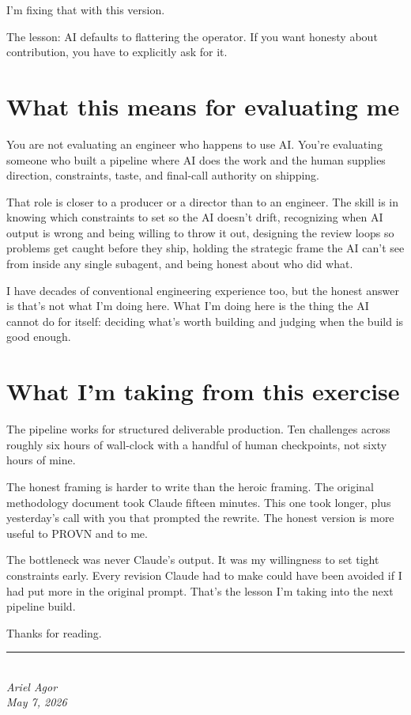 \documentclass[12pt, letterpaper]{article}
\newenvironment{insight}{%
    \begin{tcolorbox}[colback=insightbg, colframe=insightborder,
        title={\small\textbf{Key Insight}},
        fonttitle=\color{insightborder}]
}{%
    \end{tcolorbox}
}
\begin{document}
I'm fixing that with this version.

\begin{insight}
The lesson: AI defaults to flattering the operator. If you want honesty about contribution, you have to explicitly ask for it.
\end{insight}

\section{What this means for evaluating me}

You are not evaluating an engineer who happens to use AI. You're evaluating someone who built a pipeline where AI does the work and the human supplies direction, constraints, taste, and final-call authority on shipping.

That role is closer to a producer or a director than to an engineer. The skill is in knowing which constraints to set so the AI doesn't drift, recognizing when AI output is wrong and being willing to throw it out, designing the review loops so problems get caught before they ship, holding the strategic frame the AI can't see from inside any single subagent, and being honest about who did what.

I have decades of conventional engineering experience too, but the honest answer is that's not what I'm doing here. What I'm doing here is the thing the AI cannot do for itself: deciding what's worth building and judging when the build is good enough.

\section{What I'm taking from this exercise}

The pipeline works for structured deliverable production. Ten challenges across roughly six hours of wall-clock with a handful of human checkpoints, not sixty hours of mine.

The honest framing is harder to write than the heroic framing. The original methodology document took Claude fifteen minutes. This one took longer, plus yesterday's call with you that prompted the rewrite. The honest version is more useful to PROVN and to me.

The bottleneck was never Claude's output. It was my willingness to set tight constraints early. Every revision Claude had to make could have been avoided if I had put more in the original prompt. That's the lesson I'm taking into the next pipeline build.

Thanks for reading.

\vspace{30pt}
\begin{center}
\rule{0.4\textwidth}{0.4pt}\\[10pt]
\textit{Ariel Agor}\\
\textit{May 7, 2026}
\end{center}
\end{document}
